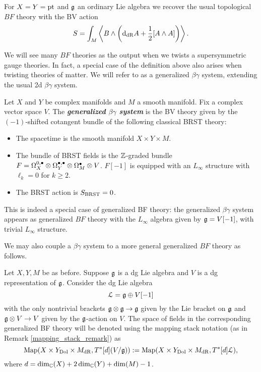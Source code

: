 \documentclass[10pt, oneside]{article}
\newcommand{\defterm}[1]{\textbf{\emph{#1}}}
\begin{document}
\begin{example}
For $X=Y=\operatorname{pt}$ and $\mathfrak g$ an ordinary Lie algebra we recover the usual topological $BF$ theory with the BV action
\[S = \int_M \left\langle B\wedge \left({\rm d}_{\mathrm{dR}} A+ \frac{1}{2}[A\wedge A]\right)\right\rangle.\]
\end{example}

We will see many $BF$ theories as the output when we twists a supersymmetric gauge theories.
In fact, a special case of the definition above also arises when twisting theories of matter.  We will refer to as a generalized $\beta\gamma$ system, extending the usual 2d $\beta \gamma$ system. 

\begin{definition}
Let $X$ and $Y$ be complex manifolds and $M$ a smooth manifold. Fix a complex vector space $V$. The \defterm{generalized $\beta\gamma$ system} is the BV theory given by the $(-1)$-shifted cotangent bundle of the following classical BRST theory:
\begin{itemize}
\item The spacetime is the smooth manifold $X\times Y\times M$.

\item The bundle of BRST fields is the $\mathbb Z$-graded bundle $F = \Omega^{0,\bullet}_X \otimes \Omega^{\bullet,\bullet}_Y \otimes \Omega^\bullet_M \otimes V$. $F[-1]$ is equipped with an $L_\infty$ structure with $\ell_{k} = 0$ for $k \geq 2$. 

\item The BRST action is $S_{\mathrm{BRST}} = 0$.
\end{itemize}
\end{definition}

\begin{rmk}
This is indeed a special case of generalized BF theory: the generalized $\beta\gamma$ system appears as generalized $BF$ theory with the $L_\infty$ algebra given by $\mathfrak g = V[-1]$, with trivial $L_\infty$ structure. 
\end{rmk}

We may also couple a $\beta\gamma$ system to a more general generalized $BF$ theory as follows.

\begin{example}
Let $X,Y,M$ be as before. Suppose $\mathfrak g$ is a dg Lie algebra and $V$ is a dg representation of $\mathfrak g$. Consider the dg Lie algebra
\[\mathcal L = \mathfrak g\oplus V[-1]\]
with the only nontrivial brackets $\mathfrak g\otimes \mathfrak g\rightarrow \mathfrak g$ given by the Lie bracket on $\mathfrak g$ and $\mathfrak g\otimes V\rightarrow V$ given by the $\mathfrak g$-action on $V$. The space of fields in the corresponding generalized BF theory will be denoted using the mapping stack notation (as in Remark \ref{mapping_stack_remark}) as
\[\operatorname{Map}(X\times Y_{\mathrm{Dol}}\times M_{\mathrm{dR}}, T^*[d] (V / \mathfrak g)):=\operatorname{Map}(X\times Y_{\mathrm{Dol}}\times M_{\mathrm{dR}}, T^*[d] \mathcal L),\]
where $d = \dim_\mathbb C(X) + 2\dim_\mathbb C(Y) + \dim(M) - 1$.
\end{example}
\end{document}
